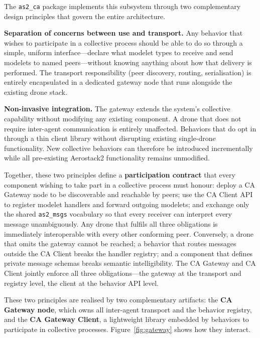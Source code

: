 \documentclass[deliverable]{csreport}
\renewcommand{\code}[1]{\texttt{\textcolor{CSMaroon}{#1}}}%
\begin{document}
The \code{as2\_ca} package implements this subsystem through two complementary design principles that govern the entire architecture.

\textbf{Separation of concerns between use and transport.} Any behavior that wishes to participate in a collective process should be able to do so through a simple, uniform interface---declare what modelet types to receive and send modelets to named peers---without knowing anything about how that delivery is performed. The transport responsibility (peer discovery, routing, serialisation) is entirely encapsulated in a dedicated gateway node that runs alongside the existing drone stack.

\textbf{Non-invasive integration.} The gateway extends the system's collective capability without modifying any existing component. A drone that does not require inter-agent communication is entirely unaffected. Behaviors that do opt in through a thin client library without disrupting existing single-drone functionality. New collective behaviors can therefore be introduced incrementally while all pre-existing Aerostack2 functionality remains unmodified.

Together, these two principles define a \textbf{participation contract} that every component wishing to take part in a collective process must honour: deploy a CA Gateway node to be discoverable and reachable by peers; use the CA Client API to register modelet handlers and forward outgoing modelets; and exchange only the shared \code{as2\_msgs} vocabulary so that every receiver can interpret every message unambiguously. Any drone that fulfils all three obligations is immediately interoperable with every other conforming peer. Conversely, a drone that omits the gateway cannot be reached; a behavior that routes messages outside the CA Client breaks the handler registry; and a component that defines private message schemas breaks semantic intelligibility. The CA Gateway and CA Client jointly enforce all three obligations---the gateway at the transport and registry level, the client at the behavior API level.

These two principles are realised by two complementary artifacts: the \textbf{CA Gateway node}, which owns all inter-agent transport and the behavior registry, and the \textbf{CA Gateway Client}, a lightweight library embedded by behaviors to participate in collective processes. Figure~\ref{fig:gateway} shows how they interact.
\end{document}

